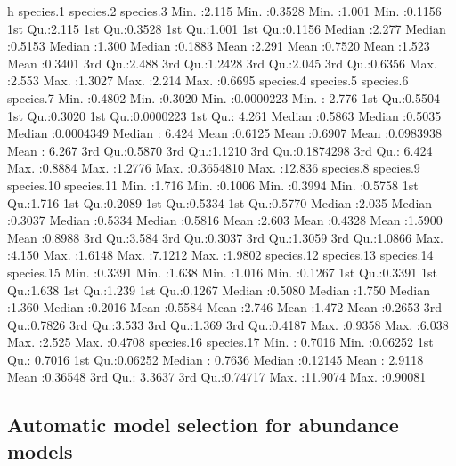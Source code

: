 \documentclass[article]{jss}
\begin{document}
\begin{CodeChunk}
\begin{CodeOutput}
       h           species.1        species.2       species.3     
 Min.   :2.115   Min.   :0.3528   Min.   :1.001   Min.   :0.1156  
 1st Qu.:2.115   1st Qu.:0.3528   1st Qu.:1.001   1st Qu.:0.1156  
 Median :2.277   Median :0.5153   Median :1.300   Median :0.1883  
 Mean   :2.291   Mean   :0.7520   Mean   :1.523   Mean   :0.3401  
 3rd Qu.:2.488   3rd Qu.:1.2428   3rd Qu.:2.045   3rd Qu.:0.6356  
 Max.   :2.553   Max.   :1.3027   Max.   :2.214   Max.   :0.6695  
   species.4        species.5        species.6           species.7     
 Min.   :0.4802   Min.   :0.3020   Min.   :0.0000223   Min.   : 2.776  
 1st Qu.:0.5504   1st Qu.:0.3020   1st Qu.:0.0000223   1st Qu.: 4.261  
 Median :0.5863   Median :0.5035   Median :0.0004349   Median : 6.424  
 Mean   :0.6125   Mean   :0.6907   Mean   :0.0983938   Mean   : 6.267  
 3rd Qu.:0.5870   3rd Qu.:1.1210   3rd Qu.:0.1874298   3rd Qu.: 6.424  
 Max.   :0.8884   Max.   :1.2776   Max.   :0.3654810   Max.   :12.836  
   species.8       species.9        species.10       species.11    
 Min.   :1.716   Min.   :0.1006   Min.   :0.3994   Min.   :0.5758  
 1st Qu.:1.716   1st Qu.:0.2089   1st Qu.:0.5334   1st Qu.:0.5770  
 Median :2.035   Median :0.3037   Median :0.5334   Median :0.5816  
 Mean   :2.603   Mean   :0.4328   Mean   :1.5900   Mean   :0.8988  
 3rd Qu.:3.584   3rd Qu.:0.3037   3rd Qu.:1.3059   3rd Qu.:1.0866  
 Max.   :4.150   Max.   :1.6148   Max.   :7.1212   Max.   :1.9802  
   species.12       species.13      species.14      species.15    
 Min.   :0.3391   Min.   :1.638   Min.   :1.016   Min.   :0.1267  
 1st Qu.:0.3391   1st Qu.:1.638   1st Qu.:1.239   1st Qu.:0.1267  
 Median :0.5080   Median :1.750   Median :1.360   Median :0.2016  
 Mean   :0.5584   Mean   :2.746   Mean   :1.472   Mean   :0.2653  
 3rd Qu.:0.7826   3rd Qu.:3.533   3rd Qu.:1.369   3rd Qu.:0.4187  
 Max.   :0.9358   Max.   :6.038   Max.   :2.525   Max.   :0.4708  
   species.16        species.17     
 Min.   : 0.7016   Min.   :0.06252  
 1st Qu.: 0.7016   1st Qu.:0.06252  
 Median : 0.7636   Median :0.12145  
 Mean   : 2.9118   Mean   :0.36548  
 3rd Qu.: 3.3637   3rd Qu.:0.74717  
 Max.   :11.9074   Max.   :0.90081  
\end{CodeOutput}
\end{CodeChunk}

\subsection{Automatic model selection for abundance
models}\label{automatic-model-selection-for-abundance-models}
\end{document}
